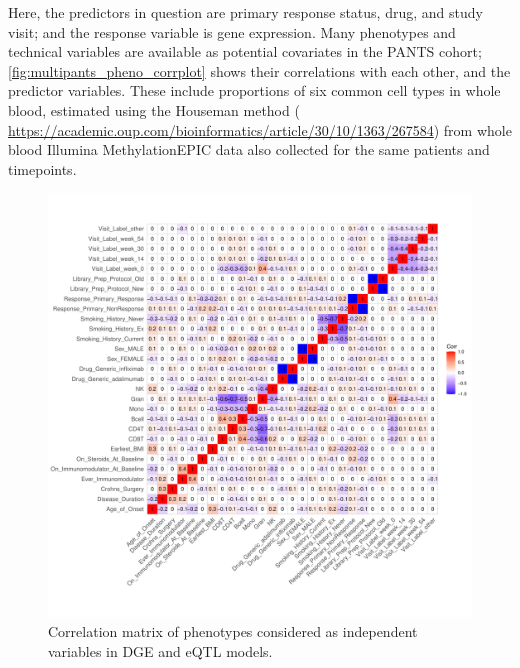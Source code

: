 \begin{outline}
\1 Here, the predictors in question are primary response status, drug, and study visit; and the response variable is gene expression.
\1 Many phenotypes and technical variables are available as potential covariates in the \gls{PANTS} cohort;
\autoref{fig:multipants_pheno_corrplot} shows their correlations with each other, and the predictor variables.
These include proportions of six common cell types in whole blood, 
estimated using the Houseman method ( \url{https://academic.oup.com/bioinformatics/article/30/10/1363/267584}) 
from whole blood Illumina MethylationEPIC data also collected for the same patients and timepoints.

\begin{figure}
    \centering
    \includegraphics[width=1.0\textwidth,page=1]{mainmatter/figures/chapter_04/process_pheno.pheno_filtered_dge.ggcorrplot.pdf}
    \caption{Correlation matrix of phenotypes considered as independent variables in DGE and eQTL models.}
    \label{fig:multipants_pheno_filtered_ggcorrplot}
\end{figure}


\end{outline}
